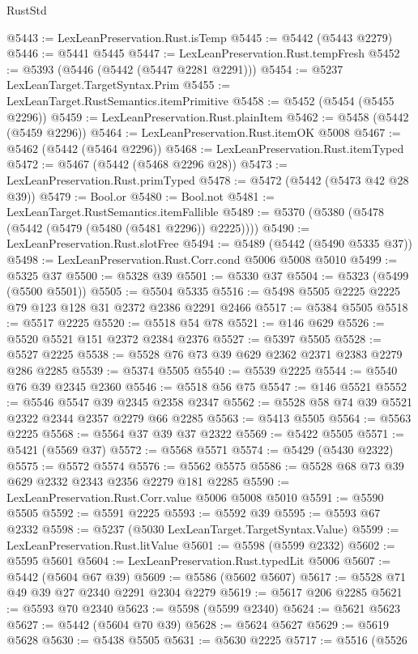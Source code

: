 \begin{lexlean}{RustStd}
\begin{coremodule}
{\begin{coremodule}
{{{{{{{{{{{{@5443 := LexLeanPreservation.Rust.isTemp
@5445 := @5442 (@5443 @2279)
@5446 := @5441 @5445
@5447 := LexLeanPreservation.Rust.tempFresh
@5452 := @5393 (@5446 (@5442 (@5447 @2281 @2291)))
@5454 := @5237 LexLeanTarget.TargetSyntax.Prim
@5455 := LexLeanTarget.RustSemantics.itemPrimitive
@5458 := @5452 (@5454 (@5455 @2296))
@5459 := LexLeanPreservation.Rust.plainItem
@5462 := @5458 (@5442 (@5459 @2296))
@5464 := LexLeanPreservation.Rust.itemOK @5008
@5467 := @5462 (@5442 (@5464 @2296))
@5468 := LexLeanPreservation.Rust.itemTyped
@5472 := @5467 (@5442 (@5468 @2296 @28))
@5473 := LexLeanPreservation.Rust.primTyped
@5478 := @5472 (@5442 (@5473 @42 @28 @39))
@5479 := Bool.or
@5480 := Bool.not
@5481 := LexLeanTarget.RustSemantics.itemFallible
@5489 := @5370 (@5380 (@5478 (@5442 (@5479 (@5480 (@5481 @2296)) @2225))))
@5490 := LexLeanPreservation.Rust.slotFree
@5494 := @5489 (@5442 (@5490 @5335 @37))
@5498 := LexLeanPreservation.Rust.Corr.cond @5006 @5008 @5010
@5499 := @5325 @37
@5500 := @5328 @39
@5501 := @5330 @37
@5504 := @5323 (@5499 (@5500 @5501))
@5505 := @5504 @5335
@5516 := @5498 @5505 @2225 @2225 @79 @123 @128 @31 @2372 @2386 @2291 @2466
@5517 := @5384 @5505
@5518 := @5517 @2225
@5520 := @5518 @54 @78
@5521 := @146 @629
@5526 := @5520 @5521 @151 @2372 @2384 @2376
@5527 := @5397 @5505
@5528 := @5527 @2225
@5538 := @5528 @76 @73 @39 @629 @2362 @2371 @2383 @2279 @286 @2285
@5539 := @5374 @5505
@5540 := @5539 @2225
@5544 := @5540 @76 @39 @2345 @2360
@5546 := @5518 @56 @75
@5547 := @146 @5521
@5552 := @5546 @5547 @39 @2345 @2358 @2347
@5562 := @5528 @58 @74 @39 @5521 @2322 @2344 @2357 @2279 @66 @2285
@5563 := @5413 @5505
@5564 := @5563 @2225
@5568 := @5564 @37 @39 @37 @2322
@5569 := @5422 @5505
@5571 := @5421 (@5569 @37)
@5572 := @5568 @5571
@5574 := @5429 (@5430 @2322)
@5575 := @5572 @5574
@5576 := @5562 @5575
@5586 := @5528 @68 @73 @39 @629 @2332 @2343 @2356 @2279 @181 @2285
@5590 := LexLeanPreservation.Rust.Corr.value @5006 @5008 @5010
@5591 := @5590 @5505
@5592 := @5591 @2225
@5593 := @5592 @39
@5595 := @5593 @67 @2332
@5598 := @5237 (@5030 LexLeanTarget.TargetSyntax.Value)
@5599 := LexLeanPreservation.Rust.litValue
@5601 := @5598 (@5599 @2332)
@5602 := @5595 @5601
@5604 := LexLeanPreservation.Rust.typedLit @5006
@5607 := @5442 (@5604 @67 @39)
@5609 := @5586 (@5602 @5607)
@5617 := @5528 @71 @49 @39 @27 @2340 @2291 @2304 @2279
@5619 := @5617 @206 @2285
@5621 := @5593 @70 @2340
@5623 := @5598 (@5599 @2340)
@5624 := @5621 @5623
@5627 := @5442 (@5604 @70 @39)
@5628 := @5624 @5627
@5629 := @5619 @5628
@5630 := @5438 @5505
@5631 := @5630 @2225
@5717 := @5516
    (@5526
}}}}}}}}}}}}
\end{coremodule}}
\end{coremodule}
\end{lexlean}
